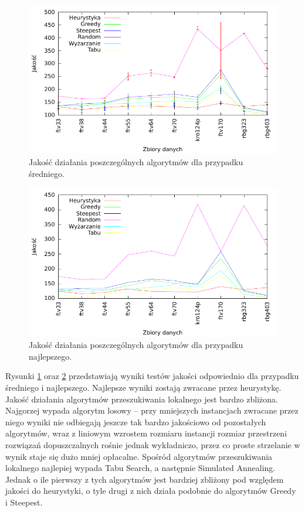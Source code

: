 \begin{figure}[!h]
\centering\includegraphics[width=12cm]{img/jakosc_avg}
\caption{Jakość działania poszczególnych algorytmów dla przypadku średniego.}\label{rys:jakosc_avg}
\end{figure}

\begin{figure}[!h]
\centering\includegraphics[width=12cm]{img/jakosc_best}
\caption{Jakość działania poszczególnych algorytmów dla przypadku najlepszego.}\label{rys:jakosc_best}
\end{figure}

Rysunki \ref{rys:jakosc_avg} oraz \ref{rys:jakosc_best} przedstawiają wyniki testów jakości odpowiednio dla przypadku średniego i najlepszego. Najlepsze wyniki zostają zwracane przez heurystykę. Jakość działania algorytmów przeszukiwania lokalnego jest bardzo zbliżona. Najgorzej wypada algorytm losowy -- przy mniejszych instancjach zwracane przez niego wyniki nie odbiegają jeszcze tak bardzo jakościowo od pozostałych algorytmów, wraz z liniowym wzrostem rozmiaru instancji rozmiar przestrzeni rozwiązań dopuszczalnych rośnie jednak wykładniczo, przez co proste strzelanie w wynik staje się dużo mniej opłacalne. Spośród algorytmów przeszukiwania lokalnego najlepiej wypada Tabu Search, a następnie Simulated Annealing. Jednak o ile pierwszy z tych algorytmów jest bardziej zbliżony pod względem jakości do heurystyki, o tyle drugi z nich działa podobnie do algorytmów Greedy i Steepest.

